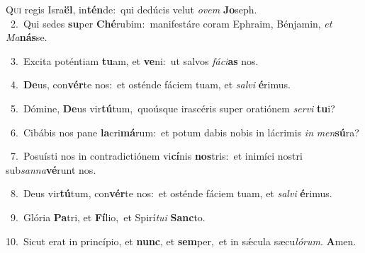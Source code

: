 \lettrine{\initial\textcolor{\initialcolor}{Q}}{ui} regis Isra\-\textbf{ël}\-, in\-\textbf{tén}\-de:~\star qui dedúcis velut \textit{o}\-\textit{vem} \textbf{Jo}\-seph.\\
{\numbfont\textcolor{\numbcolor}{~2.}}~Qui sedes \textbf{su}\-per \textbf{Ché}\-rubim:~\star manifestáre coram Ephraim, Bénjamin, \textit{et} \textit{Ma}\-\textbf{nás}se.\par
{\numbfont\textcolor{\numbcolor}{~3.}}~Excita poténtiam \textbf{tu}\-am, et \textbf{ve}\-ni:~\star ut salvos \textit{fá}\-\textit{ci}\textbf{as} nos.\par
{\numbfont\textcolor{\numbcolor}{~4.}}~\-\textbf{De}\-us, con\-\textbf{vér}\-te nos:~\star et osténde fáciem tuam, et \textit{sal}\-\textit{vi} \textbf{é}\-rimus.\par
{\numbfont\textcolor{\numbcolor}{~5.}}~Dómine, \textbf{De}\-us vir\-\textbf{tú}\-tum,~\star quoúsque irascéris super oratiónem \textit{ser}\-\textit{vi} \textbf{tu}\-i?\par
{\numbfont\textcolor{\numbcolor}{~6.}}~Cibábis nos pane \textbf{la}\-cri\-\textbf{má}\-rum:~\star et potum dabis nobis in lácrimis \textit{in} \textit{men}\-\textbf{sú}ra?\par
{\numbfont\textcolor{\numbcolor}{~7.}}~Posuísti nos in contradictiónem vi\-\textbf{cí}\-nis \textbf{nos}\-tris:~\star et inimíci nostri sub\-\textit{san}\-\textit{na}\textbf{vé}runt nos.\par
{\numbfont\textcolor{\numbcolor}{~8.}}~Deus vir\-\textbf{tú}\-tum, con\-\textbf{vér}\-te nos:~\star et osténde fáciem tuam, et \textit{sal}\-\textit{vi} \textbf{é}\-rimus.\par
{\numbfont\textcolor{\numbcolor}{~9.}}~Glória \textbf{Pa}\-tri, et \textbf{Fí}\-lio,~\star et Spirí\-\textit{tu}\-\textit{i} \textbf{Sanc}\-to.\par
{\numbfont\textcolor{\numbcolor}{10.}}~Sicut erat in princípio, et \textbf{nunc}\-, et \textbf{sem}\-per,~\star et in sǽcula sæcu\-\textit{ló}\-\textit{rum}. \textbf{A}\-men.\par
